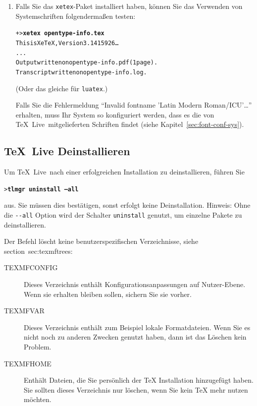 \documentclass[12pt,ngerman,a4paper,fullparskip]{report}
\newcommand{\TL}{\TeX\ Live\xspace}
\newcommand{\code}[1]{\texttt{#1}}
\newcommand{\filename}[1]{\texttt{#1}}
\newcommand{\Ucom}[1]{\textbf{\texttt{#1}}}
\begin{document}
\begin{enumerate}
\item Falls Sie das \filename{xetex}-Paket installiert haben, können Sie
das Verwenden von Systemschriften folgendermaßen testen:
\begin{alltt}
+> \Ucom{xetex opentype-info.tex}
This is XeTeX, Version 3.1415926\dots
...
Output written on opentype-info.pdf (1 page).
Transcript written on opentype-info.log.
\end{alltt}

(Oder das gleiche für \filename{luatex}.)

Falls Sie die Fehlermeldung \enquote{Invalid fontname 'Latin Modern
Roman/ICU'\dots} erhalten, muss Ihr System so konfiguriert werden, dass
es die von \TL\ mitgelieferten Schriften findet (siehe Kapitel~\ref{sec:font-conf-sys}).
\end{enumerate}

\subsection{\TL Deinstallieren}
\label{sec:uninstall}

Um \TL\ nach einer erfolgreichen Installation zu deinstallieren, führen Sie

\begin{alltt}
> \Ucom{tlmgr uninstall --all}
\end{alltt}

aus. Sie müssen dies bestätigen, sonst erfolgt keine Deinstallation. Hinweis:
Ohne die \code{-{}-all} Option wird der Schalter \code{uninstall} genutzt, um einzelne Pakete zu deinstallieren.

Der Befehl löscht keine benutzerspezifischen Verzeichnisse, siehe section~{sec:texmftrees}:

\begin{description}
\item [TEXMFCONFIG] Dieses Verzeichnis enthält Konfigurationsanpassungen auf Nutzer-Ebene. Wenn sie erhalten bleiben sollen, sichern Sie sie vorher.

\item [TEXMFVAR] Dieses Verzeichnis enthält zum Beispiel lokale Formatdateien. Wenn Sie es nicht noch zu anderen Zwecken genutzt haben, dann ist das Löschen kein Problem.

\item[TEXMFHOME] Enthält Dateien, die Sie persönlich der TeX Installation hinzugefügt haben. Sie sollten dieses Verzeichnis nur löschen, wenn Sie kein TeX mehr nutzen möchten.

\end{description}
\end{document}
